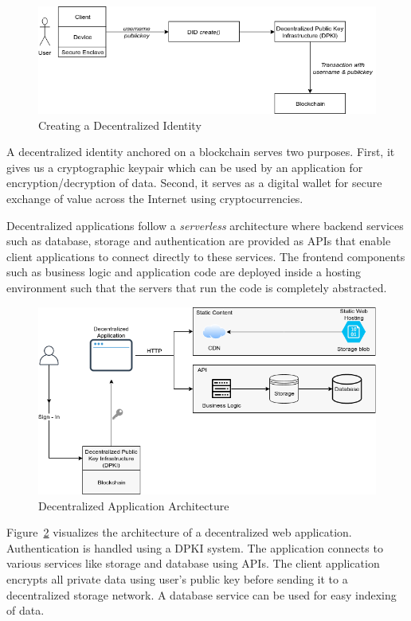 	\begin{figure}[h]
		\includegraphics[width=\linewidth]{figures/did-create}
		\caption{\label{fig:did-create} Creating a Decentralized Identity}
	\end{figure}
	
	A decentralized identity anchored on a blockchain serves two purposes. First, it gives us a cryptographic keypair which can be used by an application for encryption/decryption of data. Second, it serves as a digital wallet for secure exchange of value across the Internet using cryptocurrencies.
	
	Decentralized applications follow a \textit{serverless} architecture where backend services such as database, storage and authentication are provided as APIs that enable client applications to connect directly to these services. The frontend components such as business logic and application code are deployed inside a hosting environment such that the servers that run the code is completely abstracted.
	
	\begin{figure}[h]
		\includegraphics[width=\linewidth]{figures/dapp-architecture}
		\caption{\label{fig:dapp-architecture} Decentralized Application Architecture}
	\end{figure}

	Figure~\ref{fig:dapp-architecture} visualizes the architecture of a decentralized web application. Authentication is handled using a DPKI system. The application connects to various services like storage and database using APIs. The client application encrypts all private data using user's public key before sending it to a decentralized storage network. A database service can be used for easy indexing of data.
	
